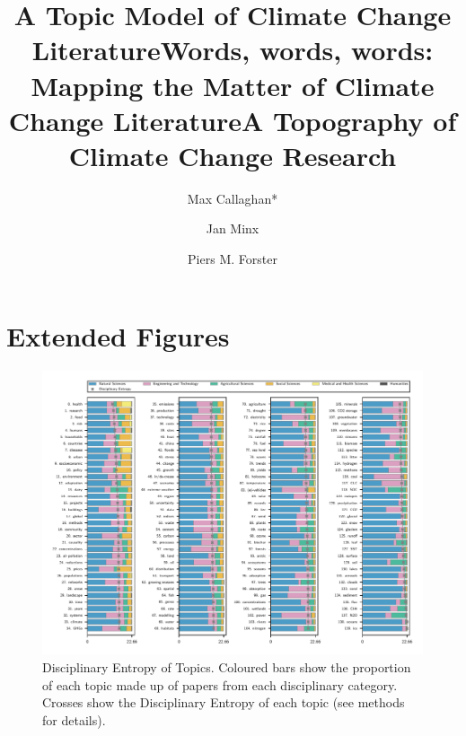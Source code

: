 \documentclass{article}
\makeatletter
\renewcommand{\maketitle}{\bgroup\setlength{\parindent}{0pt}
	\begin{flushleft}
		
		{\huge\textbf{\@title}}
		
		\bigskip
		
		{\large\textbf{\@author}}
		
		\bigskip
		
		{\large{ \@date}}
		
	\end{flushleft}\egroup
}
\makeatother
\begin{document}
	\title{A Topic Model of Climate Change Literature}
	\title{Words, words, words: Mapping the Matter of Climate Change Literature}
	\title{A Topography of Climate Change Research}
	
\author[1,2]{Max Callaghan*}
\author[1,2]{Jan Minx}
\author[2]{Piers M. Forster}

	\maketitle
	\section*{Extended Figures}
			\setcounter{figure}{0}


\begin{figure}
	\begin{center}
		\includegraphics[width=1\linewidth]{../plots_pub/topic_oecd_entropy.pdf}
		\caption{Disciplinary Entropy of Topics. Coloured bars show the proportion of each topic made up of papers from each disciplinary category. Crosses show the Disciplinary Entropy of each topic (see methods for details).}
		\label{dis-entropy}
	\end{center}
\end{figure}	
\end{document}
